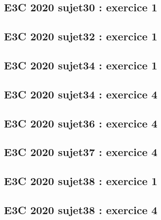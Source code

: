 \documentclass[lang=fr,edition=teacher,layout=sheet]{mxbook}
\begin{document}
\subsection*{E3C 2020 sujet30 : exercice 1}
\begingroup\endgroup
\par\bigskip
{}\subsection*{E3C 2020 sujet32 : exercice 1}
\begingroup\endgroup
\par\bigskip
{}\subsection*{E3C 2020 sujet34 : exercice 1}
\begingroup\endgroup
\par\bigskip
{}\subsection*{E3C 2020 sujet34 : exercice 4}
\begingroup\endgroup
\par\bigskip
{}\subsection*{E3C 2020 sujet36 : exercice 4}
\begingroup\endgroup
\par\bigskip
{}\subsection*{E3C 2020 sujet37 : exercice 4}
\begingroup\endgroup
\par\bigskip
{}\subsection*{E3C 2020 sujet38 : exercice 1}
\begingroup\endgroup
\par\bigskip
{}\subsection*{E3C 2020 sujet38 : exercice 4}
\end{document}

